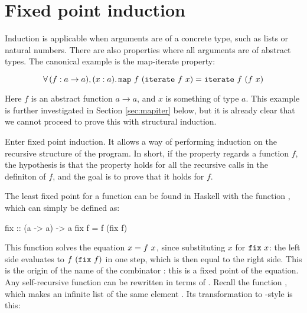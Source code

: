 \section{Fixed point induction}
\label{sec:fixpoint}

Induction is applicable when arguments are of a concrete type, such as
lists or natural numbers. There are also properties where all
arguments are of abstract types. The canonical example is the
map-iterate property:

\begin{equation*}
\faa{(f : a \rightarrow a)}{(x : a)} \hs{map} \w f \w (\hs{iterate} \w f \w x) \eq
           \hs{iterate} \w f \w (f \w x)
\end{equation*}

Here $f$ is an abstract function $a \rightarrow a$, and $x$ is
something of type $a$. This example is further investigated in Section
\ref{sec:mapiter} below, but it is already clear that we cannot proceed to
prove this with structural induction.

Enter fixed point induction. It allows a way of performing induction
on the recursive structure of the program. In short, if the property
regards a function $f$, the hypothesis is that the property holds for all
the recursive calls in the definiton of $f$, and the goal is to prove
that it holds for $f$.

\begin{comment}
It
is an early example of a technique from domain theory, attributed to
Scott and de Bakker,
\note{Citation needed: there is a book called
  Mathematical Theory of Program Correctness by Jaco de Bakker that
  could be appropriate if found}
and sometimes called Scott induction
or computational induction.  \cite{domains}
\end{comment}

The least fixed point for a function can be found in Haskell with the
function , which can simply be defined as:

\begin{code}
fix :: (a -> a) -> a
fix f = f (fix f)
\end{code}

This function solves the equation $x = f \,\, x$, since substituting $x$
for $\hs{fix} \w x$: the left side evaluates to $f \w (\hs{fix} \w f)$
in one step, which is then equal to the right side. This is the origin
of the name of the combinator : this is a fixed point of the
equation.  Any self-recursive function can be rewritten in terms of
. Recall the  function , which makes an
infinite list of the same element . Its
transformation to -style is this:

